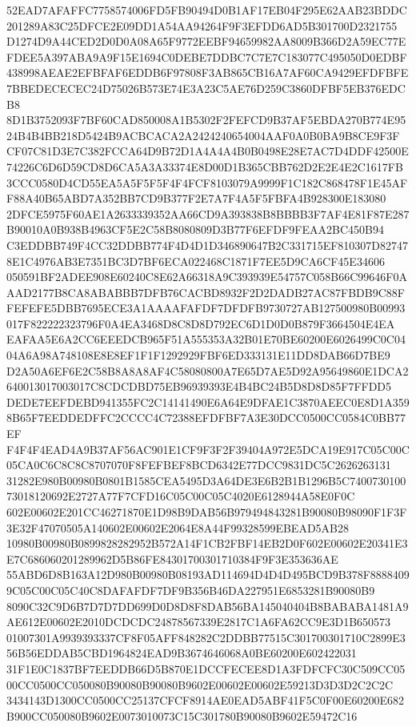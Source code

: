 \documentclass[UTF8,fontset=fandol,zihao=-4,a4paper]{ctexart}
\begin{document}
{{52EAD7AFAFFC7758574006FD5FB90494D0B1AF17EB04F295E62AAB23BDDC201289A83C25DFCE2E09DD1A54AA94264F9F3EFDD6AD5B301700D2321755
D1274D9A44CED2D0D0A08A65F9772EEBF94659982AA8009B366D2A59EC77EFDEE5A397ABA9A9F15E1694C0DEBE7DDBC7C7E7C183077C495050D0EDBF
438998AEAE2EFBFAF6EDDB6F97808F3AB865CB16A7AF60CA9429EFDFBFE7BBEDECECEC24D75026B573E74E3A23C5AE76D259C3860DFBF5EB376EDCB8
8D1B3752093F7BF60CAD850008A1B5302F2FEFCD9B37AF5EBDA270B774E9524B4B4BB218D5424B9ACBCACA2A2424240654004AAF0A0B0BA9B8CE9F3F
CF07C81D3E7C382FCCA64D9B72D1A4A4A4B0B0498E28E7AC7D4DDF42500E74226C6D6D59CD8D6CA5A3A33374E8D00D1B365CBB762D2E2E4E2C1617FB
3CCC0580D4CD55EA5A5F5F5F4F4FCF8103079A9999F1C182C868478F1E45AFF88A40B65ABD7A352BB7CD9B377F2E7A7F4A5F5FBFA4B928300E183080
2DFCE5975F60AE1A2633339352AA66CD9A393838B8BBBB3F7AF4E81F87E287B90010A0B938B4963CF5E2C58B8080809D3B77F6EFDF9FEAA2BC450B94
C3EDDBB749F4CC32DDBB774F4D4D1D346890647B2C331715EF810307D827478E1C4976AB3E7351BC3D7BF6ECA022468C1871F7EE5D9CA6CF45E34606
050591BF2ADEE908E60240C8E62A66318A9C393939E54757C058B66C99646F0AAAD2177B8CA8ABABBB7DFB76CACBD8932F2D2DADB27AC87FBDB9C88F
FEFEFE5DBB7695ECE3A1AAAAFAFDF7DFDFB9730727AB127500980B00993017F822222323796F0A4EA3468D8C8D8D792EC6D1D0D0B879F3664504E4EA
EAFAA5E6A2CC6EEEDCB965F51A555353A32B01E70BE60200E6026499C0C0404A6A98A748108E8E8EF1F1F1292929FBF6ED333131E11DD8DAB66D7BE9
D2A50A6EF6E2C58B8A8A8AF4C58080800A7E65D7AE5D92A95649860E1DCA2640013017003017C8CDCDBD75EB96939393E4B4BC24B5D8D8D85F7FFDD5
DEDE7EEFDEBD941355FC2C14141490E6A64E9DFAE1C3870AEEC0E8D1A3598B65F7EEDDEDFFC2CCCC4C72388EFDFBF7A3E30DCC0500CC0584C0BB77EF
F4F4F4EAD4A9B37AF56AC901E1CF9F3F2F39404A972E5DCA19E917C05C00C05CA0C6C8C8C8707070F8FEFBEF8BCD6342E77DCC9831DC5C2626263131
31282E980B00980B0801B1585CEA5495D3A64DE3E6B2B1B1296B5C740073010073018120692E2727A77F7CFD16C05C00C05C4020E6128944A58E0F0C
602E00602E201CC46271870E1D98B9DAB56B979494843281B90080B98090F1F3F3E32F47070505A140602E00602E2064E8A44F99328599EBEAD5AB28
10980B00980B0899828282952B572A14F1CB2FBF14EB2D0F602E00602E20341E3E7C686060201289962D5B86FE84301700301710384F9F3E353636AE
55ABD6D8B163A12D980B00980B08193AD114694D4D4D495BCD9B378F88884099C05C00C05C40C8DAFAFDF7DF9B356B46DA227951E6853281B90080B9
8090C32C9D6B7D7D7DD699D0D8D8F8DAB56BA145040404B8BABABA1481A9AE612E00602E2010DCDCDC24878567339E2817C1A6FA62CC9E3D1B650573
01007301A9939393337CF8F05AFF848282C2DDBB77515C301700301710C2899E356B56EDDAB5CBD1964824EAD9B3674646068A0BE60200E602422031
31F1E0C1837BF7EEDDB66D5B870E1DCCFECEE8D1A3FDFCFC30C509CC0500CC0500CC050080B90080B90080B9602E00602E00602E59213D3D3D2C2C2C
3434143D1300CC0500CC25137CFCF8914AE0EAD5ABF41F5C0F00E60200E682B900CC050080B9602E0073010073C15C301780B90080B9602E59472C16
}}
\end{document}
